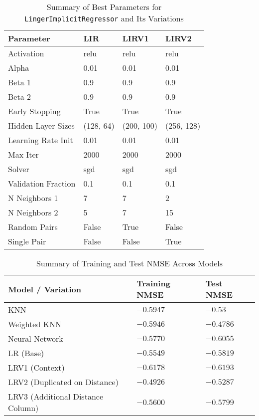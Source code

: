 \documentclass[a4paper, 12pt]{report}
\begin{document}
\begin{table}[H]
    \centering
    \caption{Summary of Best Parameters for \texttt{LingerImplicitRegressor} and Its Variations}
    \label{tab:best_parameters_LingerImageRegressor_variations_exp6}
    \begin{tabular}{|l|l|l|l|}
    \hline
    Parameter & LIR & LIRV1 & LIRV2 \\
    \hline
    Activation & relu & relu & relu \\
    Alpha & 0.01 & 0.01 & 0.01 \\
    Beta 1 & 0.9 & 0.9 & 0.9 \\
    Beta 2 & 0.9 & 0.9 & 0.9 \\
    Early Stopping & True & True & True \\
    Hidden Layer Sizes & (128, 64) & (200, 100) & (256, 128) \\
    Learning Rate Init & 0.01 & 0.01 & 0.01 \\
    Max Iter & 2000 & 2000 & 2000 \\
    Solver & sgd & sgd & sgd \\
    Validation Fraction & 0.1 & 0.1 & 0.1 \\
    N Neighbors 1 & 7 & 7 & 2 \\
    N Neighbors 2 & 5 & 7 & 15 \\
    Random Pairs & False & True & False \\
    Single Pair & False & False & True \\
    \hline
    \end{tabular}
\end{table}

\begin{table}[H]
    \centering
    \caption{Summary of Training and Test NMSE Across Models}
    \label{tab:summary_nmse_all_models_MNSE_exp6}
    \small
    \begin{tabular}{|l|l|l|}
    \toprule
    \textbf{Model / Variation} & \textbf{Training NMSE} & \textbf{Test NMSE} \\
    \midrule
    KNN & $-0.5947$ & $-0.53$ \\
    Weighted KNN & $-0.5946$ & $\mathbf{-0.4786}$ \\
    Neural Network & $-0.5770$ & $-0.6055$ \\
    LR (Base) & $-0.5549$ & $-0.5819$ \\
    LRV1 (Context) & $ -0.6178$ & $-0.6193$ \\
    LRV2 (Duplicated on Distance) & $-0.4926$ & $-0.5287$ \\
    LRV3 (Additional Distance Column) &  $-0.5600$ & $-0.5799$ \\
    \bottomrule
    \end{tabular}
\end{table}
\end{document}
